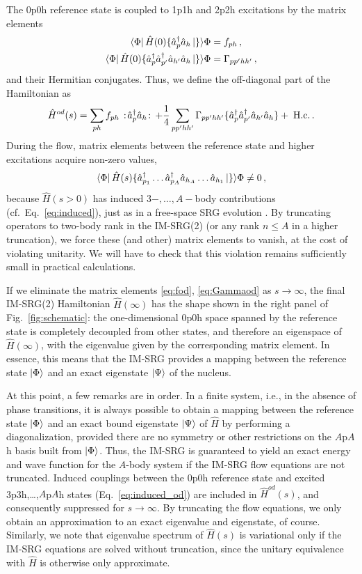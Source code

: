 The 0p0h reference state is coupled to 1p1h and 2p2h excitations by the matrix elements
\begin{align}
  \matrixe{\Phi}{\hat{H}(0)\{\aaO_{p}\aO_{h}}\}{\Phi}&=f_{ph}\,,\label{eq:fod}\\
  \matrixe{\Phi}{\hat{H}(0)\{\aaO_{p}\aaO_{p'}\aO_{h'}\aO_{h}}\}{\Phi}&=\Gamma_{pp'hh'}\label{eq:Gammaod}\,,
\end{align}
and their Hermitian conjugates. Thus, we define the off-diagonal part of the Hamiltonian as
\begin{equation}
  \hat{H}^{od}(s) = \sum_{ph}f_{ph}\nord{\aaO_p\aO_h} + \frac{1}{4}\sum_{pp'hh'}\Gamma_{pp'hh'}\{\aaO_p\aaO_{p'}\aO_{h'}\aO_h\}
                +\; \text{H.c.}\label{eq:def_Hod}\,.
\end{equation}
During the flow, matrix elements between the reference state and higher excitations acquire non-zero values,
\begin{equation}\label{eq:induced_od}
  \matrixe{\Phi}{\hat{H}(s)\{\aaO_{p_1}\ldots\aaO_{p_A}\aO_{h_{A}}\ldots\aO_{h_1}}\}{\Phi}\neq 0\,,
\end{equation}
because $\hat{H}(s>0)$ has induced $3-,\ldots,A-$body contributions (cf.~Eq.~\eqref{eq:induced}), just as in a 
free-space SRG evolution \cite{bogner2010,jurgenson2009,hebeler2012}. By truncating operators to 
two-body rank in the IM-SRG(2) (or any rank $n\leq A$ in a higher truncation), we force these (and other) 
matrix elements to vanish, at the cost of violating unitarity. We will have to check that this violation 
remains sufficiently small in practical calculations.

If we eliminate the matrix elements \eqref{eq:fod}, \eqref{eq:Gammaod} as $s\to\infty$, the final IM-SRG(2) 
Hamiltonian $\hat{H}(\infty)$ has the shape shown in the right panel of Fig.~\ref{fig:schematic}: the 
one-dimensional $0$p$0$h space spanned by the reference state is completely decoupled from other 
states, and therefore an eigenspace of $\hat{H}(\infty)$, with the eigenvalue given by the corresponding 
matrix element. In essence, this means that the IM-SRG provides a mapping between the reference 
state $\ket{\Phi}$ and an exact eigenstate $\ket{\Psi}$ of the nucleus. 

At this point, a few remarks are in order. In a finite system, i.e.,
in the absence of phase transitions, it is always possible to obtain a
mapping between the reference state $\ket{\Phi}$ and an exact bound
eigenstate $\ket{\Psi}$ of $\hat{H}$ by performing a diagonalization,
provided there are no symmetry or other restrictions on the $A$p$A$h
basis built from $\ket{\Phi}$. Thus, the IM-SRG is guaranteed to yield
an exact energy and wave function for the $A$-body system if the
IM-SRG flow equations are not truncated.  Induced couplings between
the 0p0h reference state and excited 3p3h,\ldots,$A$p$A$h states
(Eq.~\eqref{eq:induced_od}) are included in $\hat{H}^{od}(s)$, and
consequently suppressed for $s\to\infty$.  By truncating the flow
equations, we only obtain an approximation to an exact eigenvalue and
eigenstate, of course. Similarly, we note that eigenvalue spectrum of
$\hat{H}(s)$ is variational only if the IM-SRG equations are solved
without truncation, since the unitary equivalence with $\hat{H}$ is
otherwise only approximate.

